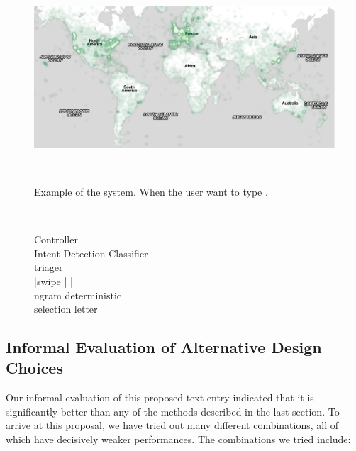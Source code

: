 \begin{figure}
  \centering
  \includegraphics[width=1.75\columnwidth]{figures/map}
  \caption{Example of the system.  When the user want to type .}
  ~\label{fig:example}
\end{figure}

\begin{figure}
\centering


	\caption{
    Controller\\
	Intent Detection Classifier\\
    triager \\
	|swipe          |                |\\
    ngram           deterministic     \\
    selection        letter           \\
}~\label{fig:systemFlowchart}
\end{figure}

\subsection{Informal Evaluation of Alternative Design Choices}

Our informal evaluation of this proposed text entry indicated that it is significantly better than any of the methods described in the last section.   To arrive at this proposal, we have tried out many different combinations, all of which have decisively weaker performances.  The combinations we tried include: 

